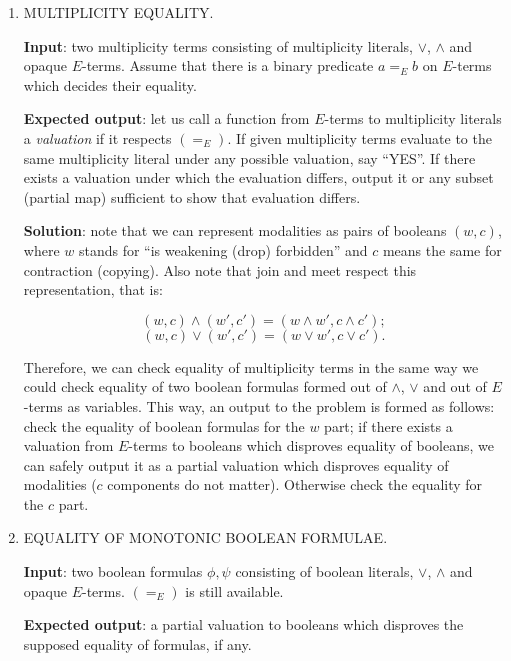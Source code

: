 \documentclass[a4paper,14pt]{extreport}
\begin{document}
\begin{enumerate}
    \item MULTIPLICITY EQUALITY.

        \textbf{Input}: two multiplicity terms consisting of multiplicity
        literals, $\lor$, $\land$ and opaque $E$-terms. Assume that there is a
        binary predicate $a =_E b$ on $E$-terms which decides their equality.

        \textbf{Expected output}: let us call a function from $E$-terms to
        multiplicity literals a \textit{valuation} if it respects $(=_E)$.
        If given multiplicity terms evaluate to the same multiplicity literal
        under any possible valuation, say ``YES''. If there exists a valuation
        under which the evaluation differs, output it or any subset (partial
        map) sufficient to show that evaluation differs.

        \textbf{Solution}: note that we can represent modalities as pairs of
        booleans $(w, c)$, where $w$ stands for ``is weakening (drop)
        forbidden'' and $c$ means the same for contraction (copying). Also note
        that join and meet respect this representation, that is:

        \[ (w, c) \land (w', c') = (w \land w', c \land c'); \]
        \[ (w, c) \lor (w', c') = (w \lor w', c \lor c'). \]

        Therefore, we can check equality of multiplicity terms in the same way
        we could check equality of two boolean formulas formed out of $\land$,
        $\lor$ and out of $E$-terms as variables. This way, an output to the
        problem is formed as follows: check the equality of boolean formulas for
        the $w$ part; if there exists a valuation from $E$-terms to booleans
        which disproves equality of booleans, we can safely output it as a
        partial valuation which disproves equality of modalities ($c$ components
        do not matter). Otherwise check the equality for the $c$ part.

    \newpage
    \item EQUALITY OF MONOTONIC BOOLEAN FORMULAE.

        \textbf{Input}: two boolean formulas $\phi, \psi$ consisting of boolean
        literals, $\lor$, $\land$ and opaque $E$-terms. $(=_E)$ is still
        available.

        \textbf{Expected output}: a partial valuation to booleans which
        disproves the supposed equality of formulas, if any.


\end{enumerate}
\end{document}
